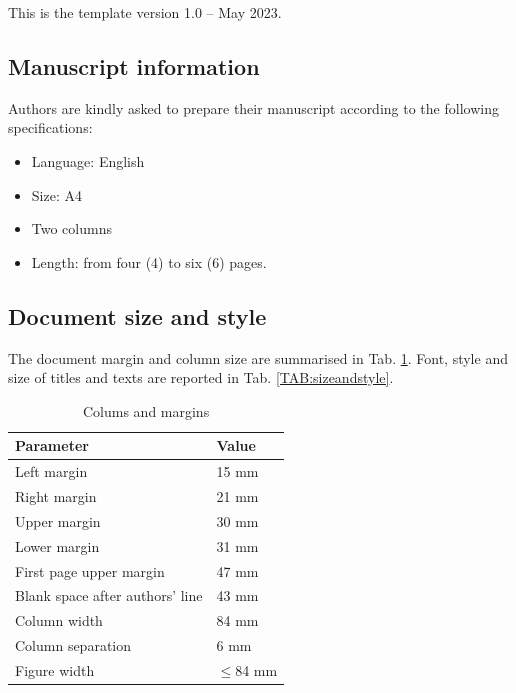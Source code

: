 \documentclass[smallextended,twocolumn]{electrimacs2024}
\newcommand{\tabref}[1]{Tab. \ref{#1}}
\begin{document}
This is the template version 1.0 – May 2023.

\subsection{Manuscript information}
Authors are kindly asked to prepare their manuscript according to the following specifications:
\begin{itemize}
  \item Language: English
  \item Size: A4
  \item Two columns
  \item Length: from four (4) to six (6) pages.
\end{itemize}

\subsection{Document size and style}
The document margin and column size are summarised in \tabref{TAB:colsandmargins}. Font, style and size of titles and texts are reported in \tabref{TAB:sizeandstyle}.
\begin{table}[!hb]
	\centering
	\caption{Colums and margins}\label{TAB:colsandmargins}
	\begin{tabular}{p{1.5in} p{1.1in}}
\hline\hline
    \textbf{Parameter}  & \textbf{Value}\\ \hline\hline
    Left margin   & 15 mm\\
	Right margin  & 21 mm\\
	Upper margin  & 30 mm\\
	Lower margin  & 31 mm\\ \hline
	First page upper margin  & 47 mm\\
    Blank space after authors' line & 43 mm\\
    Column width  & 84 mm\\
    Column separation & 6 mm\\
    Figure width  & $\le$84 mm\\ \hline\hline
	\end{tabular}
\end{table}
\end{document}
